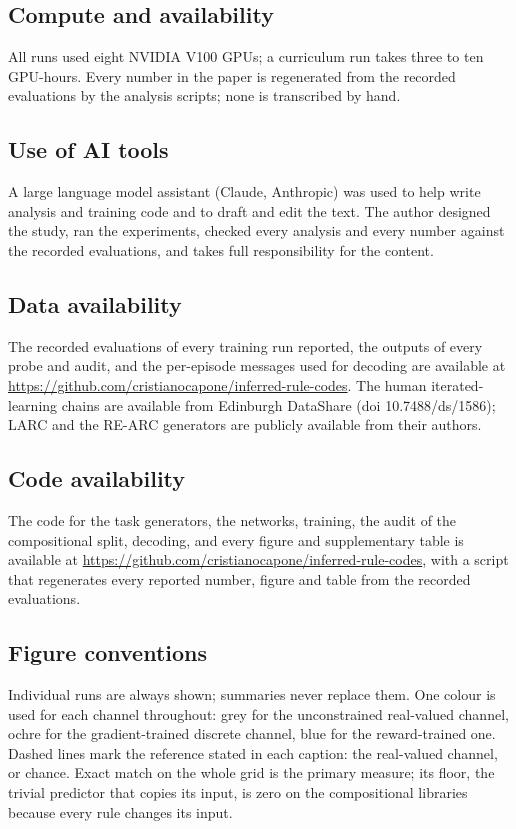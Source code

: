 \documentclass{nature}
\begin{document}
\begin{methods}
\subsection{Compute and availability}
All runs used eight NVIDIA V100 GPUs; a curriculum run takes three to ten GPU-hours. Every number in
the paper is regenerated from the recorded evaluations by the analysis scripts; none is transcribed by hand.

\subsection*{Use of AI tools}
A large language model assistant (Claude, Anthropic) was used to help write analysis and training code and to
draft and edit the text. The author designed the study, ran the experiments, checked every analysis and every
number against the recorded evaluations, and takes full responsibility for the content.

\subsection*{Data availability}
The recorded evaluations of every training run reported, the outputs of every probe and audit, and the
per-episode messages used for decoding are available at
\url{https://github.com/cristianocapone/inferred-rule-codes}. The human
iterated-learning chains are available from Edinburgh DataShare (doi 10.7488/ds/1586); LARC and the RE-ARC
generators are publicly available from their authors.

\subsection*{Code availability}
The code for the task generators, the networks, training, the audit of the compositional split, decoding,
and every figure and supplementary table is available at \url{https://github.com/cristianocapone/inferred-rule-codes},
with a script that regenerates every reported number, figure and table from the recorded evaluations.

\subsection{Figure conventions}
Individual runs are always shown; summaries never replace them. One colour is used for each channel
throughout: grey for the unconstrained real-valued channel, ochre for the gradient-trained discrete
channel, blue for the reward-trained one. Dashed lines mark the reference stated in each caption: the real-valued channel, or chance. Exact
match on the whole grid is the primary measure; its floor, the trivial predictor that copies its
input, is zero on the compositional libraries because every rule changes its input.
\end{methods}
\end{document}
